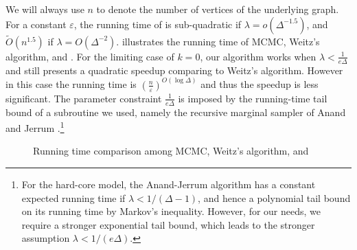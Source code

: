 \documentclass[11pt,a4paper]{amsart}
\newcommand{\eps}{\varepsilon}
\theoremstyle{definition}
\theoremstyle{remark}
\begin{document}
We will always use $n$ to denote the number of vertices of the underlying graph.
For a constant $\eps$,
the running time of  is sub-quadratic if $\lambda=o(\Delta^{-1.5})$,
and $\widetilde{O}(n^{1.5})$ if $\lambda=O(\Delta^{-2})$. 
 illustrates the running time of MCMC, Weitz's algorithm, and .
For the limiting case of $k=0$, our algorithm works when $\lambda<\frac{1}{e\Delta}$ and still presents a quadratic speedup comparing to Weitz's algorithm.
However in this case the running time is $\left( \frac{n}{\eps} \right)^{O(\log \Delta)}$ and thus the speedup is less significant.
The parameter constraint $\frac{1}{e\Delta}$ is imposed by the running-time tail bound of a subroutine we used, namely the recursive marginal sampler of Anand and Jerrum \cite{AJ22}.\footnote{For the hard-core model, the Anand-Jerrum algorithm has a constant expected running time if $\lambda<1/(\Delta-1)$, and hence a polynomial tail bound on its running time by Markov's inequality. However, for our needs, we require a stronger exponential tail bound, which leads to the stronger assumption $\lambda<1/(e\Delta)$.}


\begin{figure}[!htbp]
  \centering
  \caption{Running time comparison among MCMC, Weitz's algorithm, and }
  \label{fig:run-time}
\end{figure}
\end{document}
